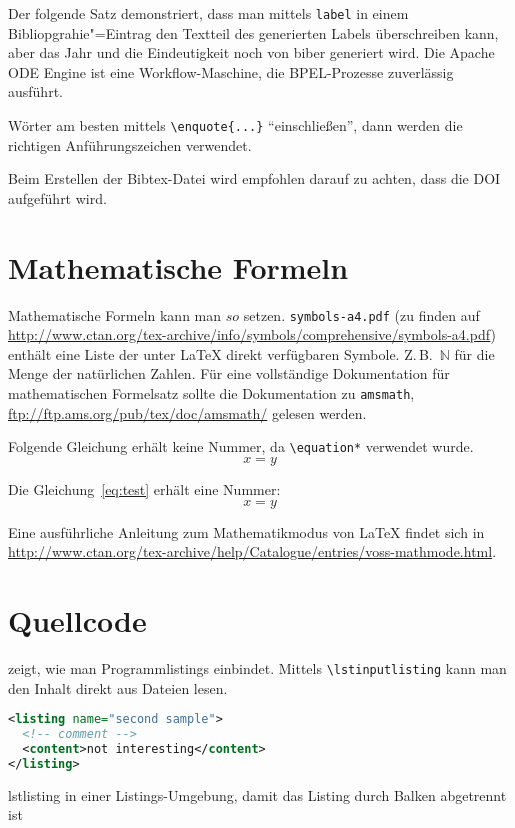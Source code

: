 Der folgende Satz demonstriert, dass man mittels \texttt{label} in einem Bibliopgrahie"=Eintrag den Textteil des generierten Labels überschreiben kann, aber das Jahr und die Eindeutigkeit noch von biber generiert wird.
Die Apache ODE Engine \cite{ApacheODE} ist eine Workflow-Maschine, die BPEL-Prozesse zuverlässig ausführt.

Wörter am besten mittels \texttt{\textbackslash enquote\{...\}} \enquote{einschließen}, dann werden die richtigen Anführungszeichen verwendet.

Beim Erstellen der Bibtex-Datei wird empfohlen darauf zu achten, dass die DOI aufgeführt wird.

\section{Mathematische Formeln}
\label{sec:mf}
Mathematische Formeln kann man $so$ setzen. \texttt{symbols-a4.pdf} (zu finden auf \url{http://www.ctan.org/tex-archive/info/symbols/comprehensive/symbols-a4.pdf}) enthält eine Liste der unter LaTeX direkt verfügbaren Symbole.
Z.\,B.\ $\mathbb{N}$ für die Menge der natürlichen Zahlen.
Für eine vollständige Dokumentation für mathematischen Formelsatz sollte die Dokumentation zu \texttt{amsmath}, \url{ftp://ftp.ams.org/pub/tex/doc/amsmath/} gelesen werden.

Folgende Gleichung erhält keine Nummer, da \texttt{\textbackslash equation*} verwendet wurde.
\begin{equation*}
  x = y
\end{equation*}

Die Gleichung~\ref{eq:test} erhält eine Nummer:
\begin{equation}
  \label{eq:test}
  x = y
\end{equation}

Eine ausführliche Anleitung zum Mathematikmodus von LaTeX findet sich in \url{http://www.ctan.org/tex-archive/help/Catalogue/entries/voss-mathmode.html}.

\section{Quellcode}
 zeigt, wie man Programmlistings einbindet.
Mittels \texttt{\textbackslash lstinputlisting} kann man den Inhalt direkt aus Dateien lesen.

\begin{Listing}
  \begin{lstlisting}[language=XML]
<listing name="second sample">
  <!-- comment -->
  <content>not interesting</content>
</listing>
\end{lstlisting}
  \caption{lstlisting in einer Listings-Umgebung, damit das Listing durch Balken abgetrennt ist}
  \label{lst:ListingANDlstlisting}
\end{Listing}

